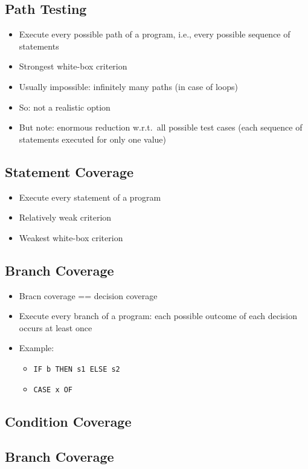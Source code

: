 \subsection{Path Testing}
				
\begin{itemize}
	\item Execute every possible path of a program, i.e., every possible sequence of statements
	\item Strongest white-box criterion
	\item Usually impossible: infinitely many paths (in case of loops)
	\item So: not a realistic option
	\item But note: enormous reduction w.r.t.\ all possible test cases (each sequence of statements executed for only one value)
\end{itemize}
		
\subsection{Statement Coverage}
			
\begin{itemize}
	\itemsep0em
	\item Execute every statement of a program
	\item Relatively weak criterion 
	\item Weakest white-box criterion
\end{itemize}
				
\subsection{Branch Coverage}
			
\begin{itemize}
	\item Bracn coverage == decision coverage
	\item Execute every branch of a program: each possible outcome of each decision occurs at least once
	\item Example:
	\begin{itemize}
		\item \verb|IF b THEN s1 ELSE s2|
		\item \verb|CASE x OF|
	\end{itemize}
\end{itemize}
			
\subsection{Condition Coverage}
			
\subsection{Branch Coverage}
